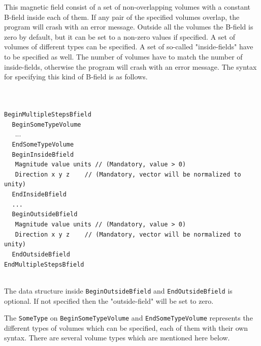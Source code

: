 This magnetic field consist of a set of non-overlapping volumes with a constant B-field inside each of them. If any pair of the 
specified volumes overlap, the program will crash with an error message. Outside all the volumes the B-field is zero by default, 
but it can be set to a non-zero values if specified. A set of volumes of different types can be specified. A set of so-called 
"inside-fields" have to be specified as well. The number of volumes have to match the number of inside-fields, otherwise the 
program will crash with an error message. The syntax for specifying this kind of B-field is as follows.

~\\
~\\
\noindent
{\tt BeginMultipleStepsBfield} \\
$~~~~~${\tt BeginSomeTypeVolume} \\
$~~~~~~~${...} \\
$~~~~~${\tt EndSomeTypeVolume}   \\
$~~~~~${\tt BeginInsideBfield} \\
$~~~~~~~${\tt Magnitude    value  units      // (Mandatory, value > 0)} \\
$~~~~~~~${\tt Direction    x  y  z   $~~~~~$ // (Mandatory, vector will be normalized to unity)} \\
$~~~~~${\tt EndInsideBfield} \\
$~~~~~${\tt ...} \\
$~~~~~${\tt BeginOutsideBfield} \\
$~~~~~~~${\tt Magnitude    value  units      // (Mandatory, value > 0)} \\
$~~~~~~~${\tt Direction    x  y  z   $~~~~~$ // (Mandatory, vector will be normalized to unity)} \\
$~~~~~${\tt EndOutsideBfield} \\
{\tt EndMultipleStepsBfield}

~\\
\noindent
The data structure inside {\tt BeginOutsideBfield} and {\tt EndOutsideBfield} is optional. If not specified 
then the "outside-field" will be set to zero. 

The {\tt SomeType} on {\tt BeginSomeTypeVolume} and {\tt EndSomeTypeVolume} represents the different types of 
volumes which can be specified, each of them with their own syntax. There are several volume types which are mentioned 
here below.

